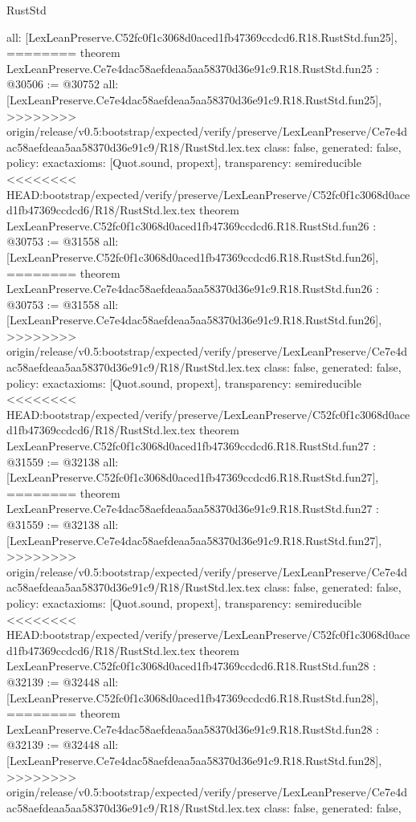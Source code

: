 \begin{lexlean}{RustStd}
\begin{coremodule}
{\begin{coremodule}
{{{{{{{{{{{{{{{{{{{{{{{{{{{{  all: [LexLeanPreserve.C52fc0f1c3068d0aced1fb47369ccdcd6.R18.RustStd.fun25],
========
theorem LexLeanPreserve.Ce7e4dac58aefdeaa5aa58370d36e91c9.R18.RustStd.fun25 : @30506 := @30752 {
  all: [LexLeanPreserve.Ce7e4dac58aefdeaa5aa58370d36e91c9.R18.RustStd.fun25],
>>>>>>>> origin/release/v0.5:bootstrap/expected/verify/preserve/LexLeanPreserve/Ce7e4dac58aefdeaa5aa58370d36e91c9/R18/RustStd.lex.tex
  class: false,
  generated: false,
  policy: exact{axioms: [Quot.sound, propext]},
  transparency: semireducible
}
<<<<<<<< HEAD:bootstrap/expected/verify/preserve/LexLeanPreserve/C52fc0f1c3068d0aced1fb47369ccdcd6/R18/RustStd.lex.tex
theorem LexLeanPreserve.C52fc0f1c3068d0aced1fb47369ccdcd6.R18.RustStd.fun26 : @30753 := @31558 {
  all: [LexLeanPreserve.C52fc0f1c3068d0aced1fb47369ccdcd6.R18.RustStd.fun26],
========
theorem LexLeanPreserve.Ce7e4dac58aefdeaa5aa58370d36e91c9.R18.RustStd.fun26 : @30753 := @31558 {
  all: [LexLeanPreserve.Ce7e4dac58aefdeaa5aa58370d36e91c9.R18.RustStd.fun26],
>>>>>>>> origin/release/v0.5:bootstrap/expected/verify/preserve/LexLeanPreserve/Ce7e4dac58aefdeaa5aa58370d36e91c9/R18/RustStd.lex.tex
  class: false,
  generated: false,
  policy: exact{axioms: [Quot.sound, propext]},
  transparency: semireducible
}
<<<<<<<< HEAD:bootstrap/expected/verify/preserve/LexLeanPreserve/C52fc0f1c3068d0aced1fb47369ccdcd6/R18/RustStd.lex.tex
theorem LexLeanPreserve.C52fc0f1c3068d0aced1fb47369ccdcd6.R18.RustStd.fun27 : @31559 := @32138 {
  all: [LexLeanPreserve.C52fc0f1c3068d0aced1fb47369ccdcd6.R18.RustStd.fun27],
========
theorem LexLeanPreserve.Ce7e4dac58aefdeaa5aa58370d36e91c9.R18.RustStd.fun27 : @31559 := @32138 {
  all: [LexLeanPreserve.Ce7e4dac58aefdeaa5aa58370d36e91c9.R18.RustStd.fun27],
>>>>>>>> origin/release/v0.5:bootstrap/expected/verify/preserve/LexLeanPreserve/Ce7e4dac58aefdeaa5aa58370d36e91c9/R18/RustStd.lex.tex
  class: false,
  generated: false,
  policy: exact{axioms: [Quot.sound, propext]},
  transparency: semireducible
}
<<<<<<<< HEAD:bootstrap/expected/verify/preserve/LexLeanPreserve/C52fc0f1c3068d0aced1fb47369ccdcd6/R18/RustStd.lex.tex
theorem LexLeanPreserve.C52fc0f1c3068d0aced1fb47369ccdcd6.R18.RustStd.fun28 : @32139 := @32448 {
  all: [LexLeanPreserve.C52fc0f1c3068d0aced1fb47369ccdcd6.R18.RustStd.fun28],
========
theorem LexLeanPreserve.Ce7e4dac58aefdeaa5aa58370d36e91c9.R18.RustStd.fun28 : @32139 := @32448 {
  all: [LexLeanPreserve.Ce7e4dac58aefdeaa5aa58370d36e91c9.R18.RustStd.fun28],
>>>>>>>> origin/release/v0.5:bootstrap/expected/verify/preserve/LexLeanPreserve/Ce7e4dac58aefdeaa5aa58370d36e91c9/R18/RustStd.lex.tex
  class: false,
  generated: false,
}}}}}}}}}}}}}}}}}}}}}}}}}}}}}}}}
\end{coremodule}}
\end{coremodule}
\end{lexlean}
